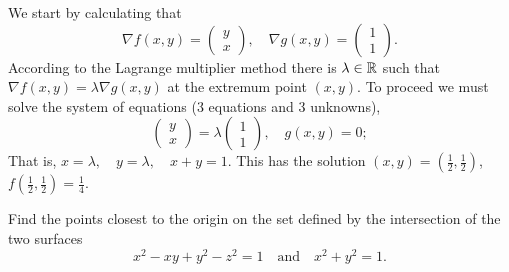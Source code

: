 \begin{solution}
    We start by calculating that
    \[
        \nabla f(x,y) = \left(\begin{smallmatrix}
                y\\ x
            \end{smallmatrix}\right),
        \quad
        \nabla g(x,y) = \left(\begin{smallmatrix}
                1\\ 1
            \end{smallmatrix}\right).
    \]
    According to the Lagrange multiplier method there is \(\lambda\in \mathbb{R}\) such that \(\nabla f(x,y) = \lambda \nabla g(x,y)\) at the extremum point \((x,y)\).
    To proceed we must solve the system of equations (3 equations and 3 unknowns),
    \[
        \left(\begin{smallmatrix}
                y\\ x
            \end{smallmatrix}\right)
        = \lambda \left(\begin{smallmatrix}
                1\\ 1
            \end{smallmatrix}\right),
        \quad g(x,y) =0;
    \]
    That is,
    \( x = \lambda, \quad
    y = \lambda, \quad
    x+y = 1
    \).
    This has the solution \((x,y) = (\frac{1}{2},\frac{1}{2})\), \(f(\frac{1}{2},\frac{1}{2})= \frac{1}{4}\).
\end{solution}



\begin{task}
    Find the points closest to the origin on the set defined by the intersection of the two surfaces
    \[
        x^2 - xy + y^2 - z^2 = 1
        \quad \text{and} \quad
        x^2 + y^2 = 1.
    \]
\end{task}

